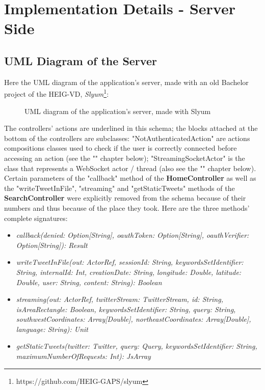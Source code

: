 \documentclass[a4paper,11pt]{report}
\begin{document}
\section{Implementation Details - Server Side}
\subsection{UML Diagram of the Server}
Here the UML diagram of the application's server, made with an old Bachelor project of the HEIG-VD, \emph{Slyum}\footnote{https://github.com/HEIG-GAPS/slyum}:
\begin{figure}[H]
\begin{center}
\caption{UML diagram of the application's server, made with Slyum}
\end{center}
\end{figure}
The controllers' actions are underlined in this schema; the blocks attached at the bottom of the controllers are subclasses: "NotAuthenticatedAction" are actions compositions classes used to check if the user is correctly connected before accessing an action (see the "" chapter below); "StreamingSocketActor" is the class that represents a WebSocket actor / thread (also see the "" chapter below).
Certain parameters of the "callback" method of the \textbf{HomeController} as well as the "writeTweetInFile", "streaming" and "getStaticTweets" methods of the \textbf{SearchController} were explicitly removed from the schema because of their numbers and thus because of the place they took. Here are the three methods' complete signatures: 
\begin{itemize}
\item \emph{callback(denied: Option[String], oauthToken: Option[String], oauthVerifier: Option[String]): Result}
\item \emph{writeTweetInFile(out: ActorRef, sessionId: String, keywordsSetIdentifier: String, internalId: Int, creationDate: String, longitude: Double, latitude: Double, user: String, content: String): Boolean}
\item \emph{streaming(out: ActorRef, twitterStream: TwitterStream, id: String, isAreaRectangle: Boolean, keywordsSetIdentifier: String, query: String, southwestCoordinates: Array[Double], northeastCoordinates: Array[Double], language: String): Unit}
\item \emph{getStaticTweets(twitter: Twitter, query: Query, keywordsSetIdentifier: String, maximumNumberOfRequests: Int): JsArray}
\end{itemize}
\end{document}
